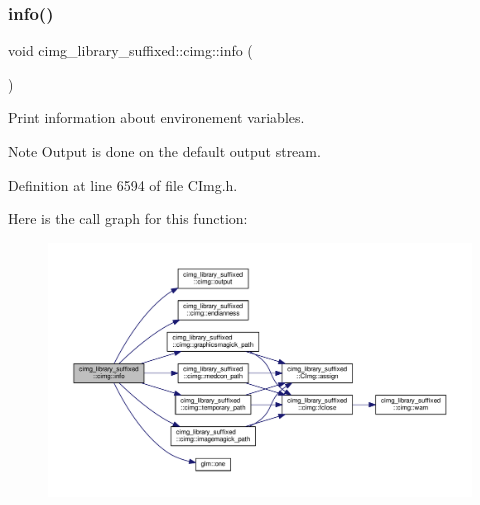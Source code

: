 \subsubsection{\texorpdfstring{info()}{info()}}
{\footnotesize\ttfamily void cimg\+\_\+library\+\_\+suffixed\+::cimg\+::info (\begin{DoxyParamCaption}{ }\end{DoxyParamCaption})\hspace{0.3cm}{\ttfamily [inline]}}



Print information about  environement variables. 

\begin{DoxyNote}{Note}
Output is done on the default output stream. 
\end{DoxyNote}


Definition at line 6594 of file C\+Img.\+h.

Here is the call graph for this function\+:
\nopagebreak
\begin{figure}[H]
\begin{center}
\leavevmode
\includegraphics[width=350pt]{d4/d9b/namespacecimg__library__suffixed_1_1cimg_a79b7a247520612001a04d8ef1c2991dc_cgraph}
\end{center}
\end{figure}
\mbox{\label{namespacecimg__library__suffixed_1_1cimg_a1f8e231e39844ce1685d2fa80edd852d}} 
